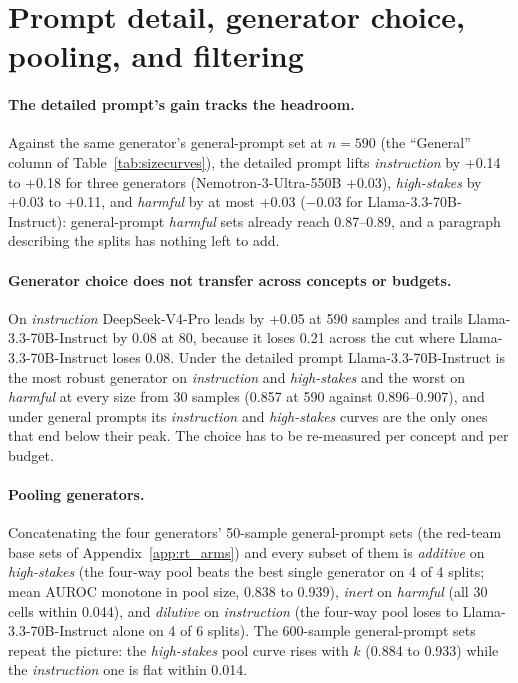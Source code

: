 \documentclass{article} %
\newcommand{\hs}{\emph{high-stakes}}
\newcommand{\harm}{\emph{harmful}}
\newcommand{\instr}{\emph{instruction}}
\begin{document}
\section{Prompt detail, generator choice, pooling, and filtering}
\label{app:more}
\paragraph{The detailed prompt's gain tracks the headroom.}
\label{sec:detailed}
Against the same generator's general-prompt set at $n=590$ (the ``General'' column of Table~\ref{tab:sizecurves}), the detailed prompt lifts \instr{} by +0.14 to +0.18 for three generators (Nemotron-3-Ultra-550B +0.03), \hs{} by +0.03 to +0.11, and \harm{} by at most +0.03 ($-0.03$ for Llama-3.3-70B-Instruct): general-prompt \harm{} sets already reach 0.87--0.89, and a paragraph describing the splits has nothing left to add.

\paragraph{Generator choice does not transfer across concepts or budgets.}
On \instr{} DeepSeek-V4-Pro leads by +0.05 at 590 samples and trails Llama-3.3-70B-Instruct by 0.08 at 80, because it loses 0.21 across the cut where Llama-3.3-70B-Instruct loses 0.08. Under the detailed prompt Llama-3.3-70B-Instruct is the most robust generator on \instr{} and \hs{} and the worst on \harm{} at every size from 30 samples (0.857 at 590 against 0.896--0.907), and under general prompts its \instr{} and \hs{} curves are the only ones that end below their peak. The choice has to be re-measured per concept and per budget.

\paragraph{Pooling generators.}
Concatenating the four generators' 50-sample general-prompt sets (the red-team base sets of Appendix~\ref{app:rt_arms}) and every subset of them is \emph{additive} on \hs{} (the four-way pool beats the best single generator on 4 of 4 splits; mean AUROC monotone in pool size, 0.838 to 0.939), \emph{inert} on \harm{} (all 30 cells within 0.044), and \emph{dilutive} on \instr{} (the four-way pool loses to Llama-3.3-70B-Instruct alone on 4 of 6 splits). The 600-sample general-prompt sets repeat the picture: the \hs{} pool curve rises with $k$ (0.884 to 0.933) while the \instr{} one is flat within 0.014.
\end{document}
